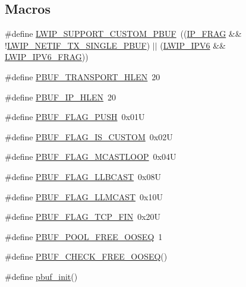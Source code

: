 \subsection*{Macros}
\begin{DoxyCompactItemize}
\item 
\#define \hyperlink{openmote-cc2538_2lwip_2src_2include_2lwip_2pbuf_8h_a64174c5169b48dc17674324afd9c63b9}{L\+W\+I\+P\+\_\+\+S\+U\+P\+P\+O\+R\+T\+\_\+\+C\+U\+S\+T\+O\+M\+\_\+\+P\+B\+UF}~((\hyperlink{group__lwip__opts__ipv4_gaf85c8bdd5035b6cada790b4cc2a209a4}{I\+P\+\_\+\+F\+R\+AG} \&\& !\hyperlink{group__lwip__opts__netif_gabafb9f64a80e51b56c0abbcfc1f7e04e}{L\+W\+I\+P\+\_\+\+N\+E\+T\+I\+F\+\_\+\+T\+X\+\_\+\+S\+I\+N\+G\+L\+E\+\_\+\+P\+B\+UF}) $\vert$$\vert$ (\hyperlink{openmote-cc2538_2lwip_2test_2fuzz_2lwipopts_8h_a872e3bb3fe2212156d66b18fccc9643f}{L\+W\+I\+P\+\_\+\+I\+P\+V6} \&\& \hyperlink{group__lwip__opts__ipv6_ga9ab6269f3087f6d9f7b2c7181ef043c3}{L\+W\+I\+P\+\_\+\+I\+P\+V6\+\_\+\+F\+R\+AG}))
\item 
\#define \hyperlink{openmote-cc2538_2lwip_2src_2include_2lwip_2pbuf_8h_af9da2e1ca60dc0c584938ccc5d662307}{P\+B\+U\+F\+\_\+\+T\+R\+A\+N\+S\+P\+O\+R\+T\+\_\+\+H\+L\+EN}~20
\item 
\#define \hyperlink{openmote-cc2538_2lwip_2src_2include_2lwip_2pbuf_8h_aae0fea237167bb06ea4dc5333df5b0a7}{P\+B\+U\+F\+\_\+\+I\+P\+\_\+\+H\+L\+EN}~20
\item 
\#define \hyperlink{openmote-cc2538_2lwip_2src_2include_2lwip_2pbuf_8h_a018a6499e357f8a1373321f802a82930}{P\+B\+U\+F\+\_\+\+F\+L\+A\+G\+\_\+\+P\+U\+SH}~0x01U
\item 
\#define \hyperlink{openmote-cc2538_2lwip_2src_2include_2lwip_2pbuf_8h_af78a7e1815dc0e31884d095b666d997f}{P\+B\+U\+F\+\_\+\+F\+L\+A\+G\+\_\+\+I\+S\+\_\+\+C\+U\+S\+T\+OM}~0x02U
\item 
\#define \hyperlink{openmote-cc2538_2lwip_2src_2include_2lwip_2pbuf_8h_ab8ad153151a8c157335d9c0cedc007e6}{P\+B\+U\+F\+\_\+\+F\+L\+A\+G\+\_\+\+M\+C\+A\+S\+T\+L\+O\+OP}~0x04U
\item 
\#define \hyperlink{openmote-cc2538_2lwip_2src_2include_2lwip_2pbuf_8h_a6772c16662bbb78597399add086500c0}{P\+B\+U\+F\+\_\+\+F\+L\+A\+G\+\_\+\+L\+L\+B\+C\+A\+ST}~0x08U
\item 
\#define \hyperlink{openmote-cc2538_2lwip_2src_2include_2lwip_2pbuf_8h_ac0d56cde47aca24ef410d730d7c89887}{P\+B\+U\+F\+\_\+\+F\+L\+A\+G\+\_\+\+L\+L\+M\+C\+A\+ST}~0x10U
\item 
\#define \hyperlink{openmote-cc2538_2lwip_2src_2include_2lwip_2pbuf_8h_a36a915aa2f6a188baa2862881407971e}{P\+B\+U\+F\+\_\+\+F\+L\+A\+G\+\_\+\+T\+C\+P\+\_\+\+F\+IN}~0x20U
\item 
\#define \hyperlink{openmote-cc2538_2lwip_2src_2include_2lwip_2pbuf_8h_ac54b0f161128a32c7419c33b893a5106}{P\+B\+U\+F\+\_\+\+P\+O\+O\+L\+\_\+\+F\+R\+E\+E\+\_\+\+O\+O\+S\+EQ}~1
\item 
\#define \hyperlink{openmote-cc2538_2lwip_2src_2include_2lwip_2pbuf_8h_a1f31e5e7b39e90b9b52654f543bb8fc5}{P\+B\+U\+F\+\_\+\+C\+H\+E\+C\+K\+\_\+\+F\+R\+E\+E\+\_\+\+O\+O\+S\+EQ}()
\item 
\#define \hyperlink{openmote-cc2538_2lwip_2src_2include_2lwip_2pbuf_8h_a0c9b6a35471ebe1628ffe74bbc67f0b4}{pbuf\+\_\+init}()
\end{DoxyCompactItemize}
